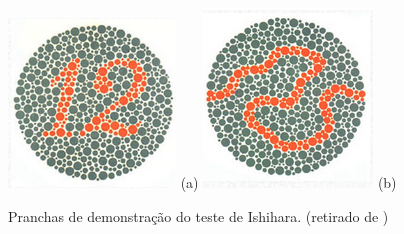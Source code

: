 \documentclass[	12pt, Times, openright, twoside, a4paper, english, brazil]{abntex2}
\begin{document}
\begin{apendicesenv}
\begin{figure}[!htb]
\centering
{\includegraphics[width=\linewidth]{ishihara-exemplos/figureIshihara1.png}}
(a)
\endminipage\hfill
{}
\centering
{\includegraphics[width=\linewidth]{ishihara-exemplos/figureIshihara38.png}}
(b)
\endminipage\hfill
\caption{Pranchas de demonstração do teste de Ishihara. (retirado de )}
\label{fig:apendiceExample}
\end{figure}


\end{apendicesenv}
\end{document}

